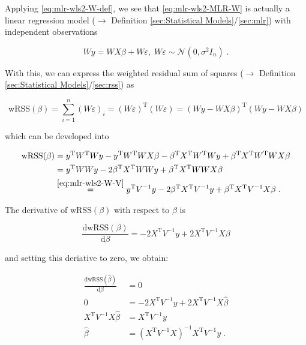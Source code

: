 \documentclass[a4paper,12pt,twoside]{book}
\begin{document}
Applying \eqref{eq:mlr-wls2-W-def}, we see that \eqref{eq:mlr-wls2-MLR-W} is actually a linear regression model ($\rightarrow$ Definition \ref{sec:Statistical Models}/\ref{sec:mlr}) with independent observations

\begin{equation} \label{eq:mlr-wls2-MLR-W-dev}
Wy = WX\beta + W\varepsilon, \; W\varepsilon \sim \mathcal{N}(0, \sigma^2 I_n) \; .
\end{equation}

With this, we can express the weighted residual sum of squares ($\rightarrow$ Definition \ref{sec:Statistical Models}/\ref{sec:rss}) as

\begin{equation} \label{eq:mlr-wls2-wRSS}
\mathrm{wRSS}(\beta) = \sum_{i=1}^n (W \varepsilon)_i = (W \varepsilon)^\mathrm{T} (W \varepsilon) = (Wy-WX\beta)^\mathrm{T} (Wy-WX\beta)
\end{equation}

which can be developed into

\begin{equation} \label{eq:mlr-wls2-wRSS-dev}
\begin{split}
\mathrm{wRSS}(\beta) &= y^\mathrm{T} W^\mathrm{T} W y - y^\mathrm{T} W^\mathrm{T} W X \beta - \beta^\mathrm{T} X^\mathrm{T} W^\mathrm{T} W y + \beta^\mathrm{T} X^\mathrm{T} W^\mathrm{T} W X \beta \\
&= y^\mathrm{T} W W y - 2 \beta^\mathrm{T} X^\mathrm{T} W W y + \beta^\mathrm{T} X^\mathrm{T} W W X \beta \\
&\overset{\eqref{eq:mlr-wls2-W-V}}{=} y^\mathrm{T} V^{-1} y - 2 \beta^\mathrm{T} X^\mathrm{T} V^{-1} y + \beta^\mathrm{T} X^\mathrm{T} V^{-1} X \beta \; .
\end{split}
\end{equation}

The derivative of $\mathrm{wRSS}(\beta)$ with respect to $\beta$ is

\begin{equation} \label{eq:mlr-wls2-wRSS-der}
\frac{\mathrm{d}\mathrm{wRSS}(\beta)}{\mathrm{d}\beta} = - 2 X^\mathrm{T} V^{-1} y + 2 X^\mathrm{T} V^{-1} X \beta
\end{equation}

and setting this deriative to zero, we obtain:

\begin{equation} \label{eq:mlr-wls2-WLS-qed}
\begin{split}
\frac{\mathrm{d}\mathrm{wRSS}(\hat{\beta})}{\mathrm{d}\beta} &= 0 \\
0 &= - 2 X^\mathrm{T} V^{-1} y + 2 X^\mathrm{T} V^{-1} X \hat{\beta} \\
X^\mathrm{T} V^{-1} X \hat{\beta} &= X^\mathrm{T} V^{-1} y \\
\hat{\beta} &= (X^\mathrm{T} V^{-1} X)^{-1} X^\mathrm{T} V^{-1} y \; .
\end{split}
\end{equation}
\end{document}
